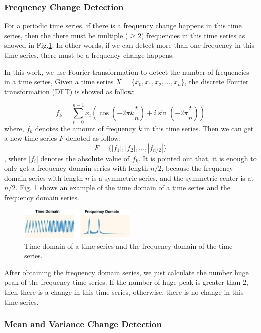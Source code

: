 \subsubsection{Frequency Change Detection}

For a periodic time series, if there is a frequency change happens in this time series, then the there must be multiple ($\geq 2 $) frequencies in this time series as showed in Fig.\ref{fig:FFT}. In other words, if we can detect more than one frequency in this time series, there must be a frequency change happens.

In this work, we use Fourier transformation to detect the number of frequencies in a time series, Given a time series $X = \{x_0,x_1,x_2,...,x_n\}$, the discrete Fourier transformation (DFT) is showed as follow:

\begin{equation}
f_k = \sum_{t=0}^{n-1}x_t(\cos(-2\pi k\frac{t}{n})+i\sin(-2\pi \frac{t}{n}))
\end{equation}
where, $f_k$ denotes the amount of frequency $k$ in this time series. Then we can get a new time series $F$ denoted as follow:
\[ F = \{|f_1|,|f_2|,...,|f_{n/2}|\}\],
where $|f_i|$ denotes the absolute value of $f_k$. It is pointed out that, it is enough to only get a frequency domain series with length $n/2$, because the frequency domain series with length $n$ is a symmetric series, and the symmetric center is at $n/2$. Fig. \ref{fig:FFT} shows an example of the time domain of a time series and the frequency domain series.

\begin{figure}
\centering
\includegraphics[width=0.5\textwidth]{FFT.eps}
\caption{Time domain of a time series and the frequency domain of the time series.}
\label{fig:FFT}
\end{figure}

After obtaining the frequency domain series, we just calculate the number huge peak of the frequency time series. If the number of huge peak is greater than $2$, then there is a change in this time series, otherwise, there is no change in this time series.

\subsubsection{Mean and Variance Change Detection}

